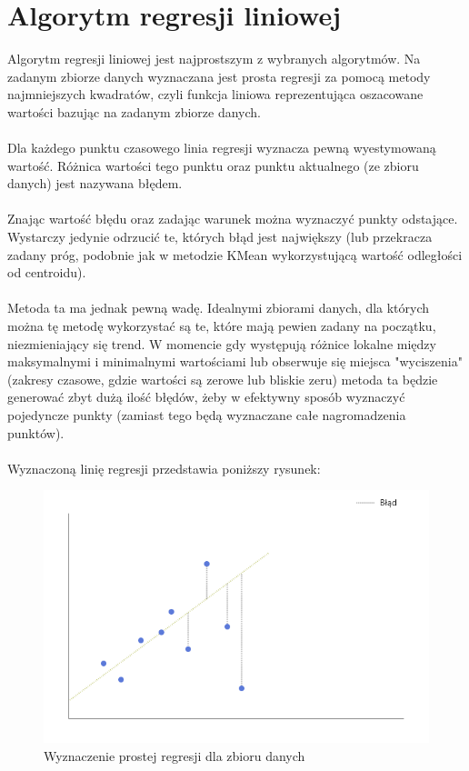 \documentclass[eng,printmode]{mgr}
\begin{document}
\section{Algorytm regresji liniowej}
Algorytm regresji liniowej jest najprostszym z wybranych algorytmów. Na zadanym zbiorze danych wyznaczana jest prosta regresji za pomocą metody najmniejszych kwadratów, czyli funkcja liniowa reprezentująca oszacowane wartości bazując na zadanym zbiorze danych. 
\\\\
Dla każdego punktu czasowego linia regresji wyznacza pewną wyestymowaną wartość. Różnica wartości tego punktu oraz punktu aktualnego (ze zbioru danych) jest nazywana błędem.
\\\\
Znając wartość błędu oraz zadając warunek można wyznaczyć punkty odstające. Wystarczy jedynie odrzucić te, których błąd jest największy (lub przekracza zadany próg, podobnie jak w metodzie KMean wykorzystującą wartość odległości od centroidu).
\\\\
Metoda ta ma jednak pewną wadę. Idealnymi zbiorami danych, dla których można tę metodę wykorzystać są te, które mają pewien zadany na początku, niezmieniający się trend. W momencie gdy występują różnice lokalne między maksymalnymi i minimalnymi wartościami lub obserwuje się miejsca "wyciszenia" (zakresy czasowe, gdzie wartości są zerowe lub bliskie zeru) metoda ta będzie generować zbyt dużą ilość błędów, żeby w efektywny sposób wyznaczyć pojedyncze punkty (zamiast tego będą wyznaczane całe nagromadzenia punktów).
\\\\
Wyznaczoną linię regresji przedstawia poniższy rysunek:

\begin{figure}[H]
  \begin{center}
  \includegraphics[scale=0.7]{linear_reg}
  \end{center}
  \caption{Wyznaczenie prostej regresji dla zbioru danych}
\end{figure}
\end{document}

